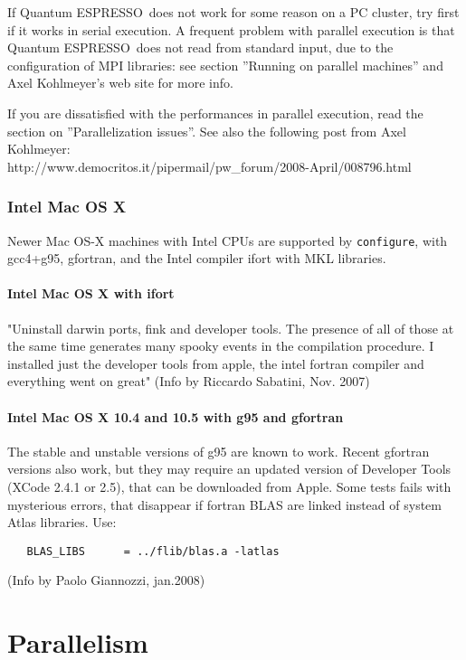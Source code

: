 \documentclass[12pt,a4paper]{article}
\def\qe{{\sc Quantum ESPRESSO}}
\begin{document}
If \qe\ does not work for some reason on a PC cluster,
try first if it works in serial execution. A frequent problem with parallel
execution is that \qe\ does not read from standard input,
due to the configuration of MPI libraries: see section 
''Running on parallel machines'' and Axel Kohlmeyer's web site for
more info. 

If you are dissatisfied with the performances in parallel execution,
read the section on ''Parallelization issues''. See also the following
post from Axel Kohlmeyer:\\
http://www.democritos.it/pipermail/pw\_forum/2008-April/008796.html

\subsubsection{Intel Mac OS X}

Newer Mac OS-X machines with Intel CPUs are supported by \texttt{configure},
with gcc4+g95, gfortran, and the Intel compiler ifort with MKL libraries.

\paragraph{Intel Mac OS X with ifort}

"Uninstall darwin ports, fink and developer tools. The presence of all of
those at the same time generates many spooky events in the compilation
procedure.  I installed just the developer tools from apple, the intel
fortran compiler and everything went on great" (Info by Riccardo Sabatini, 
Nov. 2007)

\paragraph{Intel Mac OS X 10.4 and 10.5 with g95 and gfortran}

The stable and unstable versions of g95 are known to work. Recent
gfortran versions also work, but they may require an updated version
of Developer Tools (XCode 2.4.1 or 2.5), that can be downloaded from
Apple. Some tests fails with mysterious errors, that disappear if
fortran BLAS are linked instead of system Atlas libraries. Use: 
\begin{verbatim}
   BLAS_LIBS      = ../flib/blas.a -latlas
\end{verbatim}
(Info by Paolo Giannozzi, jan.2008)

\newpage

\section{Parallelism}
\end{document}
